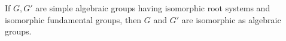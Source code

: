 If $G, G'$ are simple algebraic groups having isomorphic root systems and isomorphic fundamental groups, then $G$ and $G'$ are isomorphic as algebraic groups.
